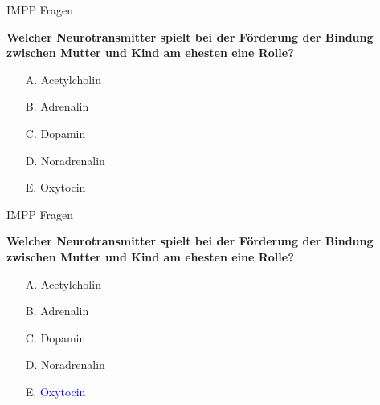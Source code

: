 \documentclass{beamer}
\begin{document}


\begin{frame}{IMPP Fragen}

\textbf{Welcher Neurotransmitter spielt bei der Förderung der Bindung zwischen Mutter und Kind am ehesten eine Rolle?
}\\[0.2 cm]

\begin{itemize}
\item[A.] Acetylcholin
\item[B.] Adrenalin
\item[C.] Dopamin
\item[D.] Noradrenalin
\item[E.] Oxytocin %

\end{itemize}


\end{frame}



\begin{frame}{IMPP Fragen}

\textbf{Welcher Neurotransmitter spielt bei der Förderung der Bindung zwischen Mutter und Kind am ehesten eine Rolle?
}\\[0.2 cm]

\begin{itemize}
\item[A.] Acetylcholin
\item[B.] Adrenalin
\item[C.] Dopamin
\item[D.] Noradrenalin
\item[E.] \textcolor{blue}{Oxytocin} %

\end{itemize}


\end{frame}
\end{document}
